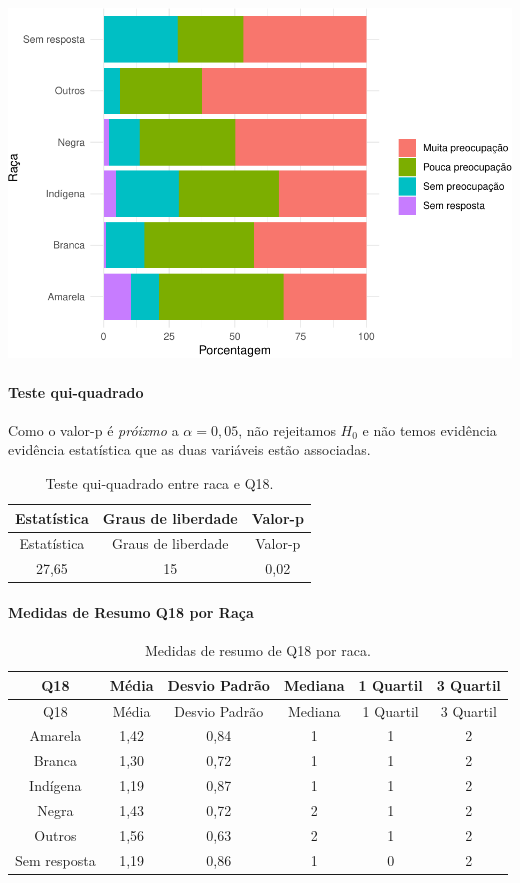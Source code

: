 \documentclass[]{article}
\let\oldparagraph\paragraph
\renewcommand{\paragraph}[1]{\oldparagraph{#1}\mbox{}}
\begin{document}
\begin{center}\includegraphics[width=0.75\linewidth]{relatorio_files/figure-latex/unnamed-chunk-241-1} \end{center}

\hypertarget{teste-qui-quadrado-26}{%
\paragraph{Teste qui-quadrado}\label{teste-qui-quadrado-26}}

Como o valor-p é \emph{próixmo} a \(\alpha=0,05\), não rejeitamos \(H_0\) e não temos evidência evidência estatística que as duas variáveis estão associadas.

\begin{longtable}[]{@{}ccc@{}}
\caption{\label{tab:unnamed-chunk-242}Teste qui-quadrado entre raca e Q18.}\tabularnewline
\toprule
Estatística & Graus de liberdade & Valor-p\tabularnewline
\midrule
\endfirsthead
\toprule
Estatística & Graus de liberdade & Valor-p\tabularnewline
\midrule
\endhead
27,65 & 15 & 0,02\tabularnewline
\bottomrule
\end{longtable}

\cleardoublepage

\hypertarget{medidas-de-resumo-q18-por-rauxe7a}{%
\paragraph{Medidas de Resumo Q18 por Raça}\label{medidas-de-resumo-q18-por-rauxe7a}}

\begin{longtable}[]{@{}cccccc@{}}
\caption{\label{tab:unnamed-chunk-243}Medidas de resumo de Q18 por raca.}\tabularnewline
\toprule
Q18 & Média & Desvio Padrão & Mediana & 1 Quartil & 3 Quartil\tabularnewline
\midrule
\endfirsthead
\toprule
Q18 & Média & Desvio Padrão & Mediana & 1 Quartil & 3 Quartil\tabularnewline
\midrule
\endhead
Amarela & 1,42 & 0,84 & 1 & 1 & 2\tabularnewline
Branca & 1,30 & 0,72 & 1 & 1 & 2\tabularnewline
Indígena & 1,19 & 0,87 & 1 & 1 & 2\tabularnewline
Negra & 1,43 & 0,72 & 2 & 1 & 2\tabularnewline
Outros & 1,56 & 0,63 & 2 & 1 & 2\tabularnewline
Sem resposta & 1,19 & 0,86 & 1 & 0 & 2\tabularnewline
\bottomrule
\end{longtable}
\end{document}
